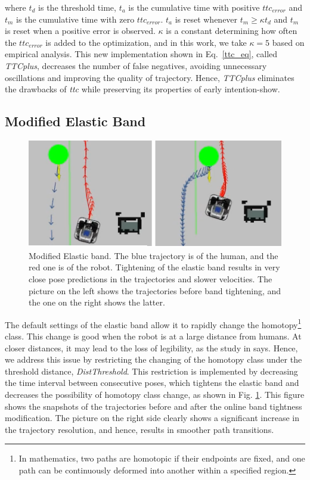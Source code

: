 where $t_d$ is the threshold time, $t_a$ is the cumulative time with positive $ttc_{error}$ and $t_m$ is the cumulative time with zero $ttc_{error}$. $t_a$ is reset whenever $t_m \ge \kappa t_d$ and $t_m$ is reset when a positive error is observed. $\kappa$ is 
a constant determining how often the $ttc_{error}$ is added to the optimization, and in this work, we take $\kappa = 5$ based on empirical analysis. This new implementation shown in Eq.~\eqref{ttc_eq}, called \textit{TTCplus}, decreases the number of false negatives, avoiding unnecessary oscillations and improving the quality of trajectory. Hence, \textit{TTCplus} eliminates the drawbacks of \textit{\acrshort{ttc}} while preserving its properties of early intention-show.

\subsection{Modified Elastic Band}
\begin{figure}[!h]
\centering
\includegraphics[width=0.9\columnwidth]{images/chapter3/tight_band_new.png}
\caption{Modified Elastic band. The blue trajectory is of the human, and the red one is of the robot. Tightening of the elastic band results in very close pose predictions in the trajectories and slower velocities. The picture on the left shows the trajectories before band tightening, and the one on the right shows the latter.}
\label{band_tight}
\end{figure}
The default settings of the elastic band allow it to rapidly change the homotopy\footnote{In mathematics, two paths are homotopic if their endpoints are fixed, and one path can be continuously deformed into another within a specified region.} class. This change is good when the robot is at a large distance from humans. At closer distances, it may lead to the loss of legibility, as the study in \cite{kruse2014evaluating} says. Hence, we address this issue by restricting the changing of the homotopy class under the threshold distance, \textit{DistThreshold}. This restriction is implemented by decreasing the time interval between consecutive poses, which tightens the elastic band and decreases the possibility of homotopy class change, as shown in Fig. \ref{band_tight}. This figure shows the snapshots of the trajectories before and after the online band tightness modification. The picture on the right side clearly shows a significant increase in the trajectory resolution, and hence, results in smoother path transitions.

